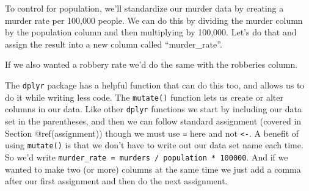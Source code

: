 \documentclass[
  a4paper,
]{krantz}
\makeatletter
\newenvironment{Shaded}{\begin{snugshade}}{\end{snugshade}}
\newcommand{\DecValTok}[1]{\textcolor[rgb]{0.00,0.00,0.81}{#1}}
\newcommand{\NormalTok}[1]{#1}
\newcommand{\OtherTok}[1]{\textcolor[rgb]{0.56,0.35,0.01}{#1}}
\newcommand{\SpecialCharTok}[1]{\textcolor[rgb]{0.00,0.00,0.00}{#1}}
\newenvironment{kframe}{%
\medskip{}
\setlength{\fboxsep}{.8em}
 \def\at@end@of@kframe{}%
 \ifinner\ifhmode%
  \def\at@end@of@kframe{\end{minipage}}%
  \begin{minipage}{\columnwidth}%
 \fi\fi%
 \def\FrameCommand##1{\hskip\@totalleftmargin \hskip-\fboxsep
 \colorbox{shadecolor}{##1}\hskip-\fboxsep
     \hskip-\linewidth \hskip-\@totalleftmargin \hskip\columnwidth}%
 \MakeFramed {\advance\hsize-\width
   \@totalleftmargin\z@ \linewidth\hsize
   \@setminipage}}%
 {\par\unskip\endMakeFramed%
 \at@end@of@kframe}
\renewenvironment{Shaded}{\begin{kframe}}{\end{kframe}}
\makeatother
\begin{document}
To control for population, we'll standardize our murder data
by creating a murder rate per 100,000 people. We can do this
by dividing the murder column by the population column and
then multiplying by 100,000. Let's do that and assign the
result into a new column called ``murder\_rate''.

\begin{Shaded}
\end{Shaded}

If we also wanted a robbery rate we'd do the same with the
robberies column.

\begin{Shaded}
\end{Shaded}

The \texttt{dplyr} package has a helpful function that can
do this too, and allows us to do it while writing less code.
The \texttt{mutate()} function lets us create or alter
columns in our data. Like other \texttt{dplyr} functions we
start by including our data set in the parentheses, and then
we can follow standard assignment (covered in Section
@ref(assignment)) though we must use \texttt{=} here and not
\texttt{\textless{}-}. A benefit of using \texttt{mutate()}
is that we don't have to write out our data set name each
time. So we'd write
\texttt{murder\_rate\ =\ murders\ /\ population\ *\ 100000}.
And if we wanted to make two (or more) columns at the same
time we just add a comma after our first assignment and then
do the next assignment.
\end{document}
